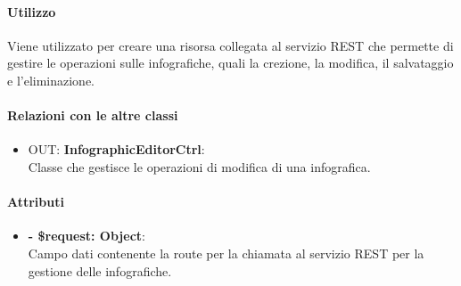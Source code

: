 		\paragraph{Utilizzo}
		Viene utilizzato per creare una risorsa collegata al servizio \gls{REST} che permette di gestire le operazioni sulle infografiche, quali la crezione, la modifica, il salvataggio e l'eliminazione.
		
		\paragraph{Relazioni con le altre classi}
		\begin{itemize}
			\item OUT: \textbf{InfographicEditorCtrl}:\\
			Classe che gestisce le operazioni di modifica di una \gls{infografica}.
		\end{itemize}
		
		\paragraph{Attributi}
		\begin{itemize}
			\item \textbf{- \$request: Object}:\\
			Campo dati contenente la route per la chiamata al servizio \gls{REST} per la gestione delle infografiche.
		\end{itemize}	
		
